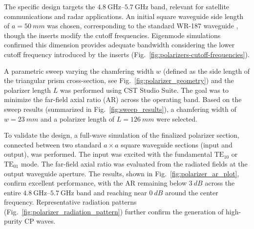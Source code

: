 \documentclass[lettersize,journal]{IEEEtran}
\newcommand{\frequencyrange}{\qtyrange{4.8}{5.7}{\giga\hertz}}
\newcommand{\TE}[2]{\text{TE}_{#1#2}}
\begin{document}
The specific design targets the $\frequencyrange$ band, relevant for satellite communications and radar applications. An initial square waveguide side length of $a = \qty{50}{mm}$ was chosen, corresponding to the standard WR-187 waveguide \cite{spinner:waveguide-specifications}, though the inserts modify the cutoff frequencies. Eigenmode simulations confirmed this dimension provides adequate bandwidth considering the lower cutoff frequency introduced by the inserts (Fig.~\ref{fig:polarizers-cutoff-frequencies}).

A parametric sweep varying the chamfering width $w$ (defined as the side length of the triangular prism cross-section, see Fig.~\ref{fig:polarizer_geometry}) and the polarizer length $L$ was performed using CST Studio Suite. The goal was to minimize the far-field axial ratio (AR) across the operating band. Based on the sweep results (summarized in Fig.~\ref{fig:sweep_results}), a chamfering width of $w = \qty{23}{mm}$ and a polarizer length of $L = \qty{126}{mm}$ were selected.

To validate the design, a full-wave simulation of the finalized polarizer section, connected between two standard $a \times a$ square waveguide sections (input and output), was performed. The input was excited with the fundamental $\TE 10$ or $\TE 01$ mode. The far-field axial ratio was evaluated from the radiated fields at the output waveguide aperture. The results, shown in Fig.~\ref{fig:polarizer_ar_plot}, confirm excellent performance, with the AR remaining below $\qty{3}{dB}$ across the entire $\frequencyrange$ band and reaching near $\qty{0}{dB}$ around the center frequency. Representative radiation patterns (Fig.~\ref{fig:polarizer_radiation_pattern}) further confirm the generation of high-purity CP waves.
\end{document}
